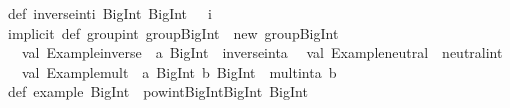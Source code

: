 \begin{isabellebody}
\begin{isamarkuptext}
{}\isanewline
\isanewline
def\ inverse{}int{}i{}\ BigInt{}{}\ BigInt\ {}\ {}{}\ i{}\isanewline
\isanewline
implicit\ def\ group{}int{}\ group{}BigInt{}\ {}\ new\ group{}BigInt{}\ {}\isanewline
\ \ val\ {}Example{}inverse{}\ {}\ {}a{}\ BigInt{}\ {}{}\ inverse{}int{}a{}\isanewline
\ \ val\ {}Example{}neutral{}\ {}\ neutral{}int\isanewline
\ \ val\ {}Example{}mult{}\ {}\ {}a{}\ BigInt{}\ b{}\ BigInt{}\ {}{}\ mult{}int{}a{}\ b{}\isanewline
{}\isanewline
\isanewline
def\ example{}\ BigInt\ {}\ pow{}int{}BigInt{}{}BigInt{}{}{}{}{}\ BigInt{}{}\ {}{}{}\isanewline

\end{isamarkuptext}
\end{isabellebody}
